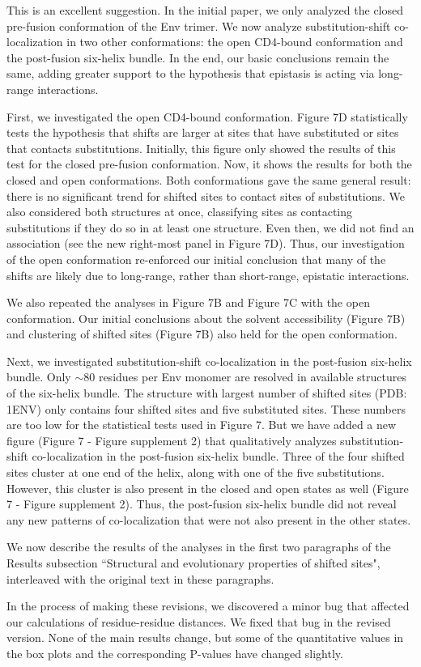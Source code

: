 \documentclass[11pt, oneside]{article}   	%
\begin{document}
{\color{black}
This is an excellent suggestion.
In the initial paper, we only analyzed the closed pre-fusion conformation of the Env trimer.
We now analyze substitution-shift co-localization in two other conformations: the open CD4-bound conformation and the post-fusion six-helix bundle.
In the end, our basic conclusions remain the same, adding greater support to the hypothesis that epistasis is acting via long-range interactions.

First, we investigated the open CD4-bound conformation.
Figure 7D statistically tests the hypothesis that shifts are larger at sites that have substituted or sites that contacts substitutions.
Initially, this figure only showed the results of this test for the closed pre-fusion conformation.
Now, it shows the results for both the closed and open conformations.
Both conformations gave the same general result: there is no significant trend for shifted sites to contact sites of substitutions.
We also considered both structures at once, classifying sites as contacting substitutions if they do so in at least one structure.
Even then, we did not find an association (see the new right-most panel in Figure 7D).
Thus, our investigation of the open conformation re-enforced our initial conclusion that many of the shifts are likely due to long-range, rather than short-range, epistatic interactions.

We also repeated the analyses in Figure 7B and Figure 7C with the open conformation.
Our initial conclusions about the solvent accessibility (Figure 7B) and clustering of shifted sites (Figure 7B) also held for the open conformation.

Next, we investigated substitution-shift co-localization in the post-fusion six-helix bundle.
Only $\sim$80 residues per Env monomer are resolved in available structures of the six-helix bundle.
The structure with largest number of shifted sites (PDB: 1ENV) only contains four shifted sites and five substituted sites.
These numbers are too low for the statistical tests used in Figure 7.
But we have added a new figure (Figure 7 - Figure supplement 2) that qualitatively analyzes substitution-shift co-localization in the post-fusion six-helix bundle.
Three of the four shifted sites cluster at one end of the helix, along with one of the five substitutions.
However, this cluster is also present in the closed and open states as well (Figure 7 - Figure supplement 2).
Thus, the post-fusion six-helix bundle did not reveal any new patterns of co-localization that were not also present in the other states.

We now describe the results of the analyses in the first two paragraphs of the Results subsection ``Structural and evolutionary properties of shifted sites", interleaved with the original text in these paragraphs.

In the process of making these revisions, we discovered a minor bug that affected our calculations of residue-residue distances. 
We fixed that bug in the revised version. 
None of the main results change, but some of the quantitative values in the box plots and the corresponding P-values have changed slightly.
}
\end{document}
